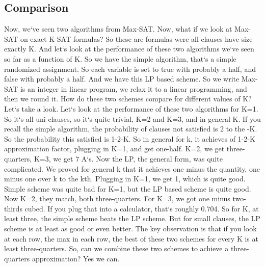 \subsection{Comparison}
Now, we`ve seen two algorithms from Max-SAT\@.
Now, what if we look at Max-SAT on exact K-SAT formulas? So these are formulas were all clauses have size exactly K\@.
And let`s look at the performance of these two algorithms we`ve seen so far as a function of K\@.
So we have the simple algorithm, that`s a simple randomized assignment.
So each variable is set to true with probably a half, and false with probably a half.
And we have this LP based scheme.
So we write Max-SAT is an integer in linear program, we relax it to a linear programming, and then we round it.
How do these two schemes compare for different values of K? Let`s take a look.
Let`s look at the performance of these two algorithms for K=1.
So it`s all uni clauses, so it`s quite trivial, K=2 and K=3, and in general K\@.
If you recall the simple algorithm, the probability of clauses not satisfied is 2 to the -K\@.
So the probability this satisfied is 1-2-K\@.
So in general for k, it achieves of 1-2-K approximation factor, plugging in K=1, and get one-half.
K=2, we get three-quarters, K=3, we get 7 A`s.
Now the LP, the general form, was quite complicated.
We proved for general k that it achieves one minus the quantity, one minus one over k to the kth.
Plugging in K=1, we get 1, which is quite good.
Simple scheme was quite bad for K=1, but the LP based scheme is quite good.
Now K=2, they match, both three-quarters.
For K=3, we got one minus two-thirds cubed.
If you plug that into a calculator, that`s roughly 0.704.
So for K, at least three, the simple scheme beats the LP scheme.
But for small clauses, the LP scheme is at least as good or even better.
The key observation is that if you look at each row, the max in each row, the best of these two schemes for every K is at least three-quarters.
So, can we combine these two schemes to achieve a three-quarters approximation? Yes we can.

